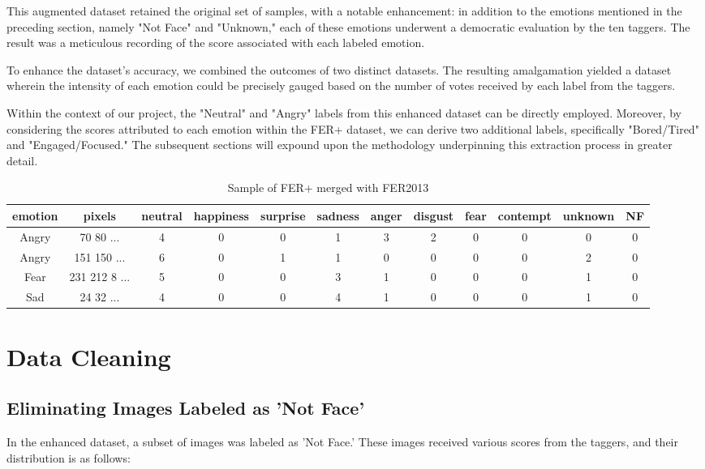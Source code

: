 This augmented dataset retained the original set of samples, with a notable enhancement: in addition to the emotions mentioned in the preceding section, namely "Not Face" and "Unknown," each of these emotions underwent a democratic evaluation by the ten taggers. The result was a meticulous recording of the score associated with each labeled emotion.

To enhance the dataset's accuracy, we combined the outcomes of two distinct datasets. The resulting amalgamation yielded a dataset wherein the intensity of each emotion could be precisely gauged based on the number of votes received by each label from the taggers.

Within the context of our project, the "Neutral" and "Angry" labels from this enhanced dataset can be directly employed. Moreover, by considering the scores attributed to each emotion within the FER+ dataset, we can derive two additional labels, specifically "Bored/Tired" and "Engaged/Focused." The subsequent sections will expound upon the methodology underpinning this extraction process in greater detail.

\begin{table}
	\centering
	\caption{Sample of FER+ merged with FER2013}
	\begin{tabular}{|c|c|c|c|c|c|c|c|c|c|c|c|}
		\hline
emotion &	pixels &	neutral &	happiness &	surprise &	sadness &	anger &	disgust &	fear &	contempt &	unknown &	NF \\ \hline
Angry &	70 80  ... &	4 &	0 &	0 &	1 &	3 &	2 &	0 &	0 &	0 &	0 \\\hline
Angry &	151 150  ... &	6 &	0 &	1 &	1 &	0 &	0 &	0 &	0 &	2 &	0 \\ \hline
Fear &	231 212 8 ... &	5 &	0 &	0 &	3 &	1 &	0 &	0 &	0 &	1 &	0 \\ \hline
Sad &	24 32 ... &	4 &	0 &	0 &	4 &	1 &	0 &	0 &	0 &	1 &	0 \\ \hline
	\end{tabular}
\end{table}


\section{Data Cleaning}
\subsection{Eliminating Images Labeled as 'Not Face'}

In the enhanced dataset, a subset of images was labeled as 'Not Face.' These images received various scores from the taggers, and their distribution is as follows:

